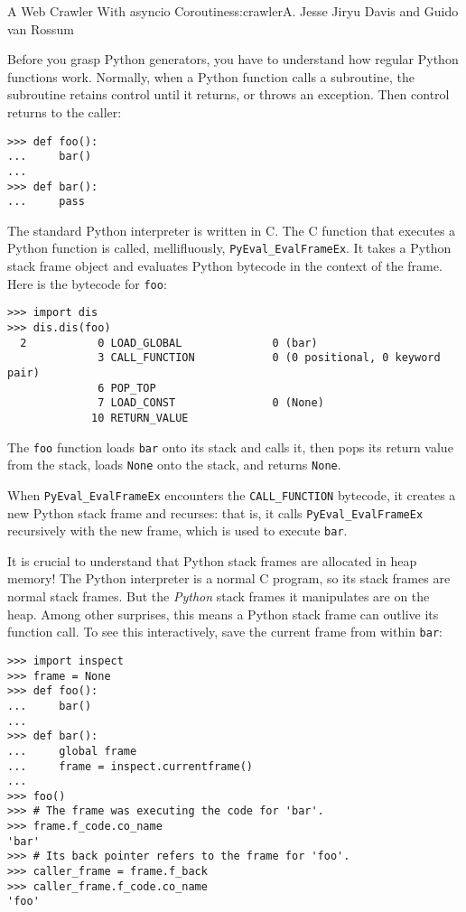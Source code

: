 \begin{aosachapter}{A Web Crawler With asyncio Coroutines}{s:crawler}{A. Jesse Jiryu Davis and Guido van Rossum}
\label{how-python-generators-work}

Before you grasp Python generators, you have to understand how regular
Python functions work. Normally, when a Python function calls a
subroutine, the subroutine retains control until it returns, or throws
an exception. Then control returns to the caller:

\begin{verbatim}
>>> def foo():
...     bar()
...
>>> def bar():
...     pass
\end{verbatim}

The standard Python interpreter is written in C. The C function that
executes a Python function is called, mellifluously,
\texttt{PyEval\_EvalFrameEx}. It takes a Python stack frame object and
evaluates Python bytecode in the context of the frame. Here is the
bytecode for \texttt{foo}:

\begin{verbatim}
>>> import dis
>>> dis.dis(foo)
  2           0 LOAD_GLOBAL              0 (bar)
              3 CALL_FUNCTION            0 (0 positional, 0 keyword pair)
              6 POP_TOP
              7 LOAD_CONST               0 (None)
             10 RETURN_VALUE
\end{verbatim}

The \texttt{foo} function loads \texttt{bar} onto its stack and calls
it, then pops its return value from the stack, loads \texttt{None} onto
the stack, and returns \texttt{None}.

When \texttt{PyEval\_EvalFrameEx} encounters the \texttt{CALL\_FUNCTION}
bytecode, it creates a new Python stack frame and recurses: that is, it
calls \texttt{PyEval\_EvalFrameEx} recursively with the new frame, which
is used to execute \texttt{bar}.


It is crucial to understand that Python stack frames are allocated in
heap memory! The Python interpreter is a normal C program, so its stack
frames are normal stack frames. But the \emph{Python} stack frames it
manipulates are on the heap. Among other surprises, this means a Python
stack frame can outlive its function call. To see this interactively,
save the current frame from within \texttt{bar}:

\begin{verbatim}
>>> import inspect
>>> frame = None
>>> def foo():
...     bar()
...
>>> def bar():
...     global frame
...     frame = inspect.currentframe()
...
>>> foo()
>>> # The frame was executing the code for 'bar'.
>>> frame.f_code.co_name
'bar'
>>> # Its back pointer refers to the frame for 'foo'.
>>> caller_frame = frame.f_back
>>> caller_frame.f_code.co_name
'foo'
\end{verbatim}


\end{aosachapter}
